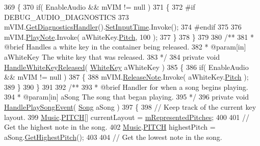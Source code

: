 \begin{DoxyCodeInclude}
369     \{
370         \textcolor{keywordflow}{if}( EnableAudio && mVIM != null )
371         \{
372 \textcolor{preprocessor}{            #if DEBUG\_AUDIO\_DIAGNOSTICS}
373                 mVIM.\hyperlink{group___v_i_m_pub_func_ga7e60bc3c5464d8f34f0d56def675bcc6}{GetDiagnosticsHandler}().\hyperlink{group___audio_testing_a133561901c2aef535b2f3c098e55b959}{SetInputTime}.Invoke();
374 \textcolor{preprocessor}{            #endif}
375 
376             mVIM.\hyperlink{group___v_i_m_events_gaa21021c13a8c9d13cbf374d5bf9d68fa}{PlayNote}.Invoke( aWhiteKey.\hyperlink{group___white_key_pub_var_ga1ddd98b85ba069defc7cf47d25f625f4}{Pitch}, 100 );
377         \}
378     \}
379 \textcolor{comment}{}
380 \textcolor{comment}{    /**}
381 \textcolor{comment}{    * @brief Handles a white key in the container being released.}
382 \textcolor{comment}{    * @param[in] aWhiteKey The white key that was released.}
383 \textcolor{comment}{    */}
384     \textcolor{keyword}{private} \textcolor{keywordtype}{void} \hyperlink{group___key_contain_handlers_ga5b98b0105300225fd79638525ad3cb3c}{HandleWhiteKeyReleased}( \hyperlink{class_white_key}{WhiteKey} aWhiteKey )
385     \{
386         \textcolor{keywordflow}{if}( EnableAudio && mVIM != null )
387         \{
388             mVIM.\hyperlink{group___v_i_m_events_ga3a1726a6366126421434c2c7be5e5678}{ReleaseNote}.Invoke( aWhiteKey.\hyperlink{group___white_key_pub_var_ga1ddd98b85ba069defc7cf47d25f625f4}{Pitch} );
389         \}
390     \}
391 \textcolor{comment}{}
392 \textcolor{comment}{    /**}
393 \textcolor{comment}{    * @brief Handler for when a song begins playing.}
394 \textcolor{comment}{    * @param[in] aSong The song that began playing.}
395 \textcolor{comment}{    */}
396     \textcolor{keyword}{private} \textcolor{keywordtype}{void} \hyperlink{group___key_contain_handlers_ga894c823059c5268af0954f83c04036ed}{HandlePlaySongEvent}( \hyperlink{class_song}{Song} aSong )
397     \{
398         \textcolor{comment}{// Keep track of the current key layout.}
399         \hyperlink{class_music}{Music}.\hyperlink{group___music_enums_ga508f69b199ea518f935486c990edac1d}{PITCH}[] currentLayout = \hyperlink{group___key_contain_priv_var_ga103945a6efe3469191e5253d13fec5be}{mRepresentedPitches};
400 
401         \textcolor{comment}{// Get the highest note in the song.}
402         \hyperlink{class_music}{Music}.\hyperlink{group___music_enums_ga508f69b199ea518f935486c990edac1d}{PITCH} highestPitch = aSong.\hyperlink{group___song_pub_func_gafaa104e8653edf64148260ecd400570f}{GetHighestPitch}();
403 
404         \textcolor{comment}{// Get the lowest note in the song.}

\end{DoxyCodeInclude}
